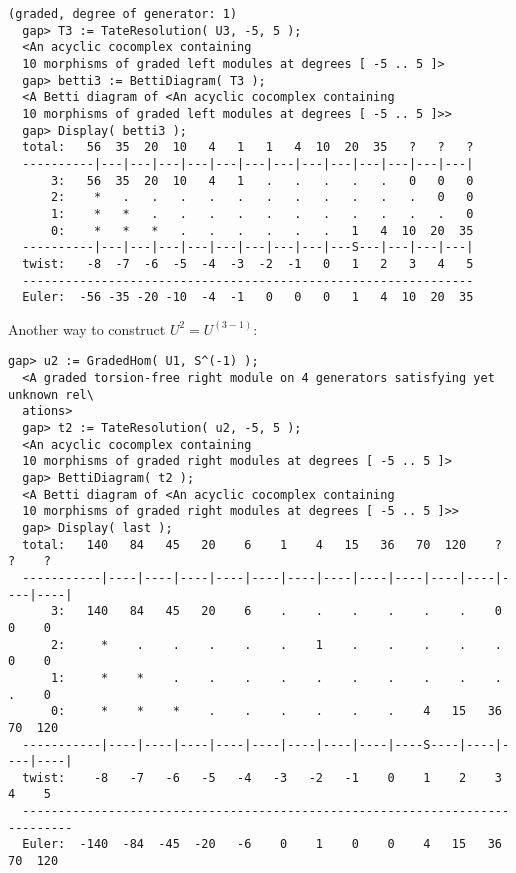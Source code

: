 \documentclass[a4paper,11pt]{report}
\begin{document}
{{{\begin{Verbatim}[fontsize=\small,frame=single,label=Example]
  (graded, degree of generator: 1)
  gap> T3 := TateResolution( U3, -5, 5 );
  <An acyclic cocomplex containing
  10 morphisms of graded left modules at degrees [ -5 .. 5 ]>
  gap> betti3 := BettiDiagram( T3 );
  <A Betti diagram of <An acyclic cocomplex containing 
  10 morphisms of graded left modules at degrees [ -5 .. 5 ]>>
  gap> Display( betti3 );
  total:   56  35  20  10   4   1   1   4  10  20  35   ?   ?   ?
  ----------|---|---|---|---|---|---|---|---|---|---|---|---|---|
      3:   56  35  20  10   4   1   .   .   .   .   .   0   0   0
      2:    *   .   .   .   .   .   .   .   .   .   .   .   0   0
      1:    *   *   .   .   .   .   .   .   .   .   .   .   .   0
      0:    *   *   *   .   .   .   .   .   .   1   4  10  20  35
  ----------|---|---|---|---|---|---|---|---|---S---|---|---|---|
  twist:   -8  -7  -6  -5  -4  -3  -2  -1   0   1   2   3   4   5
  ---------------------------------------------------------------
  Euler:  -56 -35 -20 -10  -4  -1   0   0   0   1   4  10  20  35
\end{Verbatim}
 Another way to construct $U^2=U^(3-1)$: 
\begin{Verbatim}[fontsize=\small,frame=single,label=Example]
  gap> u2 := GradedHom( U1, S^(-1) );
  <A graded torsion-free right module on 4 generators satisfying yet unknown rel\
  ations>
  gap> t2 := TateResolution( u2, -5, 5 );
  <An acyclic cocomplex containing
  10 morphisms of graded right modules at degrees [ -5 .. 5 ]>
  gap> BettiDiagram( t2 );
  <A Betti diagram of <An acyclic cocomplex containing 
  10 morphisms of graded right modules at degrees [ -5 .. 5 ]>>
  gap> Display( last );
  total:   140   84   45   20    6    1    4   15   36   70  120    ?    ?    ?
  -----------|----|----|----|----|----|----|----|----|----|----|----|----|----|
      3:   140   84   45   20    6    .    .    .    .    .    .    0    0    0
      2:     *    .    .    .    .    .    1    .    .    .    .    .    0    0
      1:     *    *    .    .    .    .    .    .    .    .    .    .    .    0
      0:     *    *    *    .    .    .    .    .    .    4   15   36   70  120
  -----------|----|----|----|----|----|----|----|----|----S----|----|----|----|
  twist:    -8   -7   -6   -5   -4   -3   -2   -1    0    1    2    3    4    5
  -----------------------------------------------------------------------------
  Euler:  -140  -84  -45  -20   -6    0    1    0    0    4   15   36   70  120
\end{Verbatim}
 }

 }

  }
\end{document}
